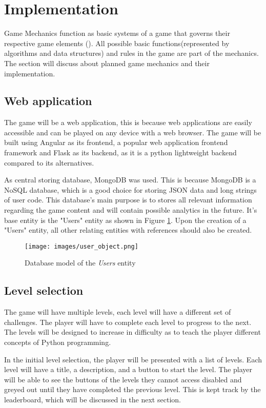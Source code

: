 \section{Implementation}
Game Mechanics function as basic systems of a game that governs their respective game elements (\cite{adams2012game}). All possible basic functions(represented by algorithms and data structures) and rules in the game are part of the mechanics. The section will discuss about planned game mechanics and their implementation.

\subsection{Web application}
The game will be a web application, this is because web applications are easily accessible and can be played on any device with a web browser. The game will be built using Angular as its frontend, a popular web application frontend framework and Flask as its backend, as it is a python lightweight backend compared to its alternatives.

As central storing database, MongoDB was used. This is because MongoDB is a NoSQL database, which is a good choice for storing JSON data and long strings of user code. This database's main purpose is to stores all relevant information regarding the game content and will contain possible analytics in the future. It's base entity is the "Users" entity as shown in Figure \ref{fig:users}. Upon the creation of a "Users" entity, all other relating entities with references should also be created.
\begin{figure}[h]
    \centering
    \texttt{[image: images/user\_object.png]}
    \caption{Database model of the \textit{Users} entity}    
    \label{fig:users}
\end{figure}

\subsection{Level selection}
The game will have multiple levels, each level will have a different set of challenges. The player will have to complete each level to progress to the next. The levels will be designed to increase in difficulty as to teach the player different concepts of Python programming.

In the initial level selection, the player will be presented with a list of levels. Each level will have a title, a description, and a button to start the level. The player will be able to see the buttons of the levels they cannot access disabled and greyed out until they have completed the previous level. This is kept track by the leaderboard, which will be discussed in the next section.

